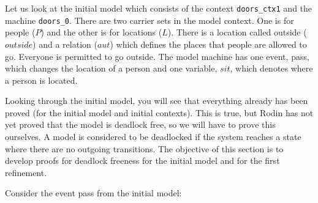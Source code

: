 

Let us look at the initial model which consists of the context \texttt{doors\_ctx1} and the machine \texttt{doors\_0}. There are two carrier sets in the model context. One is for people ($P$) and the other is for locations ($L$). There is a location called outside ($outside$) and a relation ($aut$) which defines the places that people are allowed to go. Everyone is permitted to go outside. The model machine has one event, \textsf{pass}, which changes the location of a person and one variable, $sit$, which denotes where a person is located.


Looking through the initial model, you will see that everything already has been proved (for the initial model and initial contexts). This is true, but Rodin has not yet proved that the model is deadlock free, so we will have to prove this ourselves. A model is considered to be deadlocked if the system reaches a state where there are no outgoing transitions. The objective of this section is to develop proofs for deadlock freeness for the initial model and for the first refinement.

Consider the event \textsf{pass} from the initial model:


